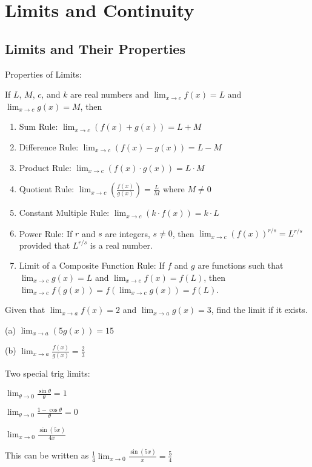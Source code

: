 \documentclass[../bccalc.tex]{subfiles}
\begin{document}
\chapter{Limits and Continuity}
\section{Limits and Their Properties}
Properties of Limits:

If $L$, $M$, $c$, and $k$ are real numbers and $\lim_{x\to c}f(x)=L$ and $\lim_{x\to c}g(x)=M$, then 
\begin{enumerate}
    \item Sum Rule: $\lim_{x\to c}(f(x)+g(x))=L+M$
    \item Difference Rule: $\lim_{x\to c}(f(x)-g(x))=L-M$
    \item Product Rule: $\lim_{x\to c}(f(x)\cdot g(x))=L\cdot M$
    \item Quotient Rule: $\lim_{x\to c}\left(\frac{f(x)}{g(x)}\right)=\frac{L}{M}$ where $M\neq 0$
    \item Constant Multiple Rule: $\lim_{x\to c}(k\cdot f(x))=k\cdot L$
    \item Power Rule: If $r$ and $s$ are integers, $s\neq 0$, then $\lim_{x\to c}(f(x))^{r/s}=L^{r/s}$ provided that $L^{r/s}$ is a real number.
    \item Limit of a Composite Function Rule: If $f$ and $g$ are functions such that $\lim_{x\to c}g(x)=L$ and $\lim_{x\to c}f(x)=f(L)$, then $\lim_{x\to c}f(g(x))=f(\lim_{x\to c}g(x))=f(L)$.
\end{enumerate}

\begin{example}
    Given that $\lim_{x\to a}f(x)=2$ and $\lim_{x\to a}g(x)=3$, find the limit if it exists.

    (a) $\lim_{x\to a}(5g(x)) = 15$

    (b) $\lim_{x\to a}\frac{f(x)}{g(x)} = \frac{2}{3}$
\end{example}

Two special trig limits:

$\lim_{\theta\to 0}\frac{\sin\theta}{\theta} = 1$

$\lim_{\theta\to 0}\frac{1-\cos\theta}{\theta}=0$

\begin{example}
    $\lim_{x\to 0}\frac{\sin(5x)}{4x}$

    This can be written as $\frac{1}{4}\lim_{x\to 0}\frac{\sin(5x)}{x} = \frac{5}{4}$
\end{example}
\end{document}
